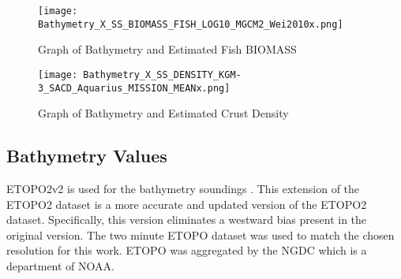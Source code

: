 
\begin{figure}[h]
    \centering
    \texttt{[image: Bathymetry\_X\_SS\_BIOMASS\_FISH\_LOG10\_MGCM2\_Wei2010x.png]}
    \caption{Graph of Bathymetry and Estimated Fish BIOMASS}
    \label{fig:bathyxfish}
\end{figure}


\begin{figure}[h]
    \centering
    \texttt{[image: Bathymetry\_X\_SS\_DENSITY\_KGM-3\_SACD\_Aquarius\_MISSION\_MEANx.png]}
    \caption{Graph of Bathymetry and Estimated Crust Density}
    \label{fig:bathyxdensity}
\end{figure}



\subsection{Bathymetry Values}
ETOPO2v2 is used for the bathymetry soundings \cite{national20062}.
This extension of the ETOPO2 dataset \cite{national1988etopo} is a more accurate and updated version of the ETOPO2 dataset.
Specifically, this version eliminates a westward bias present in the original version.
The two minute \ac{ETOPO} dataset was used to match the chosen resolution for this work.
\ac{ETOPO} was aggregated by the \ac{NGDC} which is a department of \ac{NOAA}.

